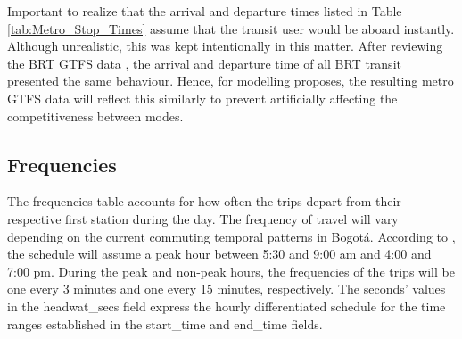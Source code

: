 \documentclass[12pt, a4paper]{report}
\begin{document}
\begin{table}[ht]
\centering
{}
\caption{Metro stop times table.}
\label{tab:Metro_Stop_Times}
\end{table}

Important to realize that the arrival and departure times listed in Table \ref{tab:Metro_Stop_Times} assume that the transit user would be aboard instantly. Although unrealistic, this was kept intentionally in this matter. After reviewing the BRT GTFS data \citep{transmilenios.a.GTFSEstaticos202306212023}, the arrival and departure time of all BRT transit presented the same behaviour. Hence, for modelling proposes, the resulting metro GTFS data will reflect this similarly to prevent artificially affecting the competitiveness between modes.

\subsection{Frequencies}

The frequencies table accounts for how often the trips depart from their respective first station during the day. The frequency of travel will vary depending on the current commuting temporal patterns in Bogotá. According to \cite{alcaldiadebogotad.c.EncuestaMovilidad20192019}, the schedule will assume a peak hour between 5:30 and 9:00 am and 4:00 and 7:00 pm. During the peak and non-peak hours, the frequencies of the trips will be one every 3 minutes and one every 15 minutes, respectively. The seconds' values in the headwat\_secs field express the hourly differentiated schedule for the time ranges established in the start\_time and end\_time fields.
\end{document}
